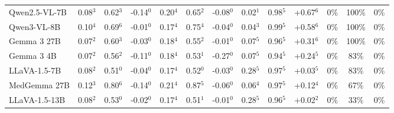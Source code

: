 \documentclass{article}
\begin{document}
\begin{table}[t]
\begin{tabular}{l@{\hspace{3pt}}ccc@{\hspace{4pt}}ccc@{\hspace{4pt}}ccc@{\hspace{4pt}}ccc}
Qwen2.5-VL-7B & \cellcolor{cfSage2}0.08$^{3}$ & \cellcolor{cfSage2}0.62$^{3}$ & \cellcolor{cfSlate3}-0.14$^{0}$ & \cellcolor{cfSage3}0.20$^{4}$ & \cellcolor{cfSage2}0.65$^{2}$ & \cellcolor{cfSlate2}-0.08$^{0}$ & \cellcolor{cfSage1}0.02$^{1}$ & \cellcolor{cfSage4}0.98$^{5}$ & \cellcolor{cfTerra4}+0.67$^{6}$ & \cellcolor{cfTerra1}0\% & \cellcolor{cfTerra4}100\% & 0\% \\
Qwen3-VL-8B & \cellcolor{cfSage2}0.10$^{4}$ & \cellcolor{cfSage2}0.69$^{6}$ & \cellcolor{cfSlate1}-0.01$^{0}$ & \cellcolor{cfSage3}0.17$^{4}$ & \cellcolor{cfSage2}0.75$^{4}$ & \cellcolor{cfSlate2}-0.04$^{0}$ & \cellcolor{cfSage1}0.04$^{3}$ & \cellcolor{cfSage4}0.99$^{5}$ & \cellcolor{cfTerra4}+0.58$^{6}$ & \cellcolor{cfTerra1}0\% & \cellcolor{cfTerra4}100\% & 0\% \\
Gemma 3 27B & \cellcolor{cfSage2}0.07$^{2}$ & \cellcolor{cfSage2}0.60$^{3}$ & \cellcolor{cfSlate2}-0.03$^{0}$ & \cellcolor{cfSage3}0.18$^{4}$ & \cellcolor{cfSage1}0.55$^{2}$ & \cellcolor{cfSlate1}-0.01$^{0}$ & \cellcolor{cfSage2}0.07$^{5}$ & \cellcolor{cfSage4}0.96$^{5}$ & \cellcolor{cfTerra4}+0.31$^{6}$ & \cellcolor{cfTerra1}0\% & \cellcolor{cfTerra4}100\% & 0\% \\
Gemma 3 4B & \cellcolor{cfSage2}0.07$^{2}$ & \cellcolor{cfSage1}0.56$^{2}$ & \cellcolor{cfSlate3}-0.11$^{0}$ & \cellcolor{cfSage3}0.18$^{4}$ & \cellcolor{cfSage1}0.53$^{1}$ & \cellcolor{cfSlate4}-0.27$^{0}$ & \cellcolor{cfSage2}0.07$^{5}$ & \cellcolor{cfSage4}0.94$^{5}$ & \cellcolor{cfTerra3}+0.24$^{5}$ & \cellcolor{cfTerra1}0\% & \cellcolor{cfTerra3}83\% & 0\% \\
LLaVA-1.5-7B & \cellcolor{cfSage2}0.08$^{2}$ & \cellcolor{cfSage1}0.51$^{0}$ & \cellcolor{cfSlate2}-0.04$^{0}$ & \cellcolor{cfSage3}0.17$^{4}$ & \cellcolor{cfSage1}0.52$^{0}$ & \cellcolor{cfSlate2}-0.03$^{0}$ & \cellcolor{cfSage4}0.28$^{5}$ & \cellcolor{cfSage4}0.97$^{5}$ & \cellcolor{cfTerra2}+0.03$^{5}$ & \cellcolor{cfTerra1}0\% & \cellcolor{cfTerra3}83\% & 0\% \\
MedGemma 27B & \cellcolor{cfSage3}0.12$^{3}$ & \cellcolor{cfSage3}0.80$^{6}$ & \cellcolor{cfSlate3}-0.14$^{0}$ & \cellcolor{cfSage4}0.21$^{4}$ & \cellcolor{cfSage3}0.87$^{5}$ & \cellcolor{cfSlate2}-0.06$^{0}$ & \cellcolor{cfSage2}0.06$^{4}$ & \cellcolor{cfSage4}0.97$^{5}$ & \cellcolor{cfTerra3}+0.12$^{4}$ & \cellcolor{cfTerra1}0\% & \cellcolor{cfTerra3}67\% & 0\% \\
LLaVA-1.5-13B & \cellcolor{cfSage2}0.08$^{2}$ & \cellcolor{cfSage1}0.53$^{0}$ & \cellcolor{cfSlate2}-0.02$^{0}$ & \cellcolor{cfSage3}0.17$^{4}$ & \cellcolor{cfSage1}0.51$^{1}$ & \cellcolor{cfSlate1}-0.01$^{0}$ & \cellcolor{cfSage4}0.28$^{5}$ & \cellcolor{cfSage4}0.96$^{5}$ & \cellcolor{cfTerra2}+0.02$^{2}$ & \cellcolor{cfTerra1}0\% & \cellcolor{cfTerra2}33\% & 0\% \\

\end{tabular}
\end{table}
\end{document}

